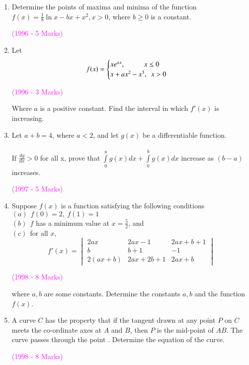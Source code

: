 \documentclass[journal,12pt,twocolumn]{IEEEtran}
\theoremstyle{remark}
\begin{document}
\begin{enumerate}
\item Determine the points of maxima and minima of the function $f(x) = \frac{1}{8}\ln{x} - bx + x^2, x>0$, where $b \geq 0$ is a constant.
\begin{flushright}
\hfill \textcolor{magenta}{(1996 - 5 Marks)}\\
\end{flushright}

\item Let 
\[ f(x) = \begin{cases}
xe^{ax}, \ \ \ \ \ \ \ \ \ \ \ x \leq 0\\
x+ax^2 - x^3, \ \ x > 0
\end{cases}\\
\]
\begin{flushright}
\hfill \textcolor{magenta}{(1996 - 3 Marks)}\\
\end{flushright}
Where $a$ is a positive constant. Find the interval in which $f'(x)$ is increasing.\\

\item Let $a + b = 4$, where $a<2$, and let $g(x)$ be a differentiable function.\\\\
If $\frac{dg}{dx}>0$ for all x, prove that $\int\limits_0^a g(x) dx + \int\limits_0^b g(x) dx$ increase as $(b-a)$ increases.
\begin{flushright}
\hfill \textcolor{magenta}{(1997 - 5 Marks)}\\
\end{flushright}

\item Suppose $f(x)$ is a function satisfying the following conditions\\
$(a) \ \ f(0) = 2,\ f(1) = 1$\\
$(b) \ \ f$ has a minimum value at $x = \frac{5}{2}$, and\\
$(c) \ \ $for all $x$,\\
$$f'(x)=
\begin{vmatrix}
2ax & 2ax-1 & 2ax+b+1\\
b & b+1 & -1\\
2(ax+b) & 2ax+2b+1 & 2ax+b
\end{vmatrix}$$
\begin{flushright}
\hfill \textcolor{magenta}{(1998 - 8 Marks)}\\
\end{flushright}
where $a, b$ are some constants. Determine the constants $a, b$ and the function $f(x)$.

\item A curve $C$ has the property that if the tangent drawn at any point $P$ on $C$ meets the co-ordinate axes at $A$ and $B$, then $P$ is the mid-point of $AB$. The curve passes through the point . Determine the equation of the curve.
\begin{flushright}
\hfill \textcolor{magenta}{(1998 - 8 Marks)}\\
\end{flushright}
 
\end{enumerate}
\end{document}
